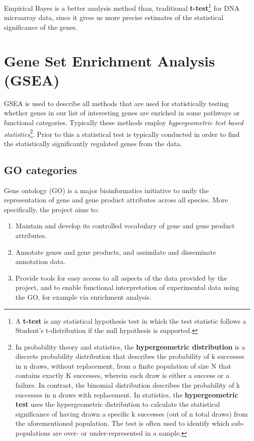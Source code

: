 \documentclass[oneside, a4paper, 11pt]{book}
\begin{document}
Empirical Bayes is a better analysis method than, traditional \textbf{t-test}\footnote{A \textbf{t-test} is any statistical hypothesis test in which the test statistic follows a Student's t-distribution if the null hypothesis is supported.} for DNA microarray data, since it gives us more precise estimates of the statistical significance of the genes.

\section{Gene Set Enrichment Analysis (GSEA)}
GSEA is used to describe all methods that are used for statistically testing whether genes in our list of interesting genes are enriched in some pathways or functional categories. Typically these methods employ \textit{hypergeometric test based statistics}\footnote{In probability theory and statistics, the \textbf{hypergeometric distribution} is a discrete probability distribution that describes the probability of k successes in n draws, without replacement, from a finite population of size N that contains exactly K successes, wherein each draw is either a success or a failure. In contrast, the binomial distribution describes the probability of k successes in n draws with replacement. In statistics, the \textbf{hypergeometric test} uses the hypergeometric distribution to calculate the statistical significance of having drawn a specific k successes (out of n total draws) from the aforementioned population. The test is often used to identify which sub-populations are over- or under-represented in a sample.}. Prior to this a statistical test is typically conducted in order to find the statistically significantly regulated genes from the data.

\subsection{GO categories}
Gene ontology (GO) is a major bioinformatics initiative to unify the representation of gene and gene product attributes across all species. More specifically, the project aims to: 

\begin{enumerate}
    \item Maintain and develop its controlled vocabulary of gene and gene product attributes.
    \item Annotate genes and gene products, and assimilate and disseminate annotation data.
    \item Provide tools for easy access to all aspects of the data provided by the project, and to enable functional interpretation of experimental data using the GO, for example via enrichment analysis.
\end{enumerate}
\end{document}
